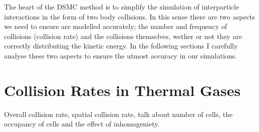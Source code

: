 The heart of the DSMC method is to simplify the simulation of interparticle interactions in the form of two body collisions.
In this sense there are two aspects we need to ensure are modelled accurately; the number and frequency of collisions (collision rate) and the collisions themselves, wether or not they are correctly distributing the kinetic energy.
In the following sections I carefully analyse these two aspects to ensure the utmost accuracy in our simulations.


\section{Collision Rates in Thermal Gases} \label{sec:collisionRates}

Overall collision rate, spatial collision rate, talk about number of cells, the occupancy of cells and the effect of inhomogeniety.
 
